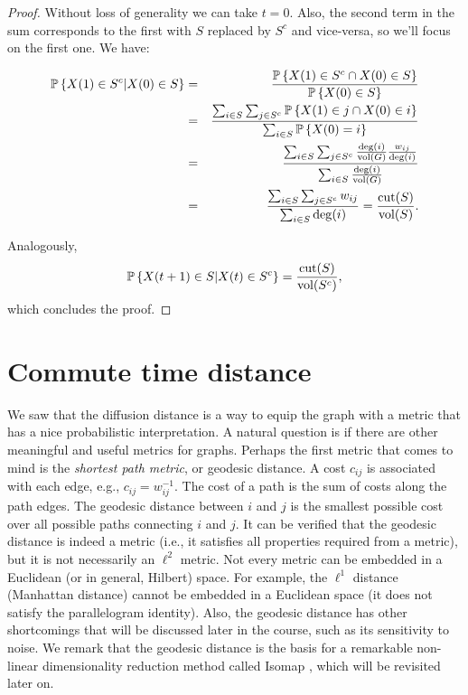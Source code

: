 \begin{proof}
Without loss of generality we can take $t=0$. Also, the second term in the sum corresponds to the first with $S$ replaced by $S^c$ and vice-versa, so we'll focus on the first one. We have:

\begin{eqnarray*}
{\mathbb{P}}\left\{ X(1) \in S^c | X(0) \in S  \right\} & = & \frac{{\mathbb{P}}\left\{ X(1) \in S^c \cap X(0) \in S  \right\}}{{\mathbb{P}}\left\{ X(0) \in S  \right\}} \\
& = & \frac{\sum_{i\in S}\sum_{j\in S^c} {\mathbb{P}}\left\{ X(1) \in j \cap X(0) \in i  \right\}}{\sum_{i\in S} {\mathbb{P}}\left\{ X(0) = i  \right\}} \\
& = & \frac{\sum_{i\in S}\sum_{j\in S^c} \frac{\deg(i)}{\operatorname{vol}(G)} \frac{w_{ij}}{\deg(i)}}{\sum_{i\in S} \frac{\deg(i)}{\operatorname{vol}(G)}} \\
& = & \frac{\sum_{i\in S}\sum_{j\in S^c} w_{ij}}{ \sum_{i\in S} \deg(i)}  =  \frac{\operatorname{cut}(S) }{ \operatorname{vol}(S)}.
\end{eqnarray*}

Analogously,
\[
{\mathbb{P}}\left\{ X(t+1) \in S | X(t) \in S^c  \right\} = \frac{\operatorname{cut}(S) }{ \operatorname{vol}(S^c)},
\]
which concludes the proof.
\end{proof}

\section{Commute time distance}\label{s:commute}

We saw that the diffusion distance is a way to equip the graph with a metric that has a nice probabilistic interpretation.  
A natural question is if there are other meaningful and useful metrics for graphs. Perhaps the first metric that comes to mind is the {\em shortest path metric}, or geodesic distance. A cost $c_{ij}$ is associated with each edge, e.g., $c_{ij} = w_{ij}^{-1}$. The cost of a path is the sum of costs along the path edges. The geodesic distance between $i$ and $j$ is the smallest possible cost over all possible paths connecting $i$ and $j$. It can be verified that the geodesic distance is indeed a metric (i.e., it satisfies all properties required from a metric), but it is not necessarily an $\ell^2$ metric. Not every metric can be embedded in a Euclidean (or in general, Hilbert) space. For example, the $\ell^1$ distance (Manhattan distance) cannot be embedded in a Euclidean space (it does not satisfy the parallelogram identity). Also, the geodesic distance has other shortcomings that will be discussed later in the course, such as its sensitivity to noise. We remark that the geodesic distance is the basis for a remarkable non-linear dimensionality reduction method called Isomap \cite{ISOMAP_paper_2000}, which will be revisited later on.

